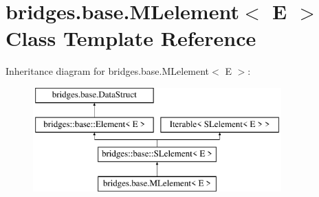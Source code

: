 \hypertarget{classbridges_1_1base_1_1_m_lelement}{}\section{bridges.\+base.\+M\+Lelement$<$ E $>$ Class Template Reference}
\label{classbridges_1_1base_1_1_m_lelement}
Inheritance diagram for bridges.\+base.\+M\+Lelement$<$ E $>$\+:\begin{figure}[H]
\begin{center}
\leavevmode
\includegraphics[height=4.000000cm]{classbridges_1_1base_1_1_m_lelement}
\end{center}
\end{figure}
